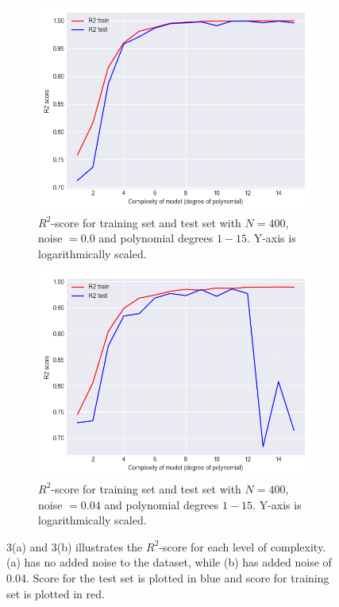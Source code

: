 \documentclass[a4paper,twocolumn]{article}
\begin{document}
\begin{figure}[ht]
    \centering
    \begin{subfigure}[b]{0.9\columnwidth}
        \includegraphics[width=\columnwidth]{r2_vs_complexity_N=400_Noise=0.0_Degree=1-15.png}
        \caption{$R^{2}$-score for training set and test set with $N = 400$, noise $= 0.0$ and polynomial degrees $1-15$. Y-axis is logarithmically scaled.}
    \end{subfigure}
    
    \begin{subfigure}[b]{0.9\columnwidth}
        \includegraphics[width=\columnwidth]{r2_vs_complexity_N=400_Noise=0.04_Degree=1-15.png}
        \caption{$R^{2}$-score for training set and test set with $N = 400$, noise $= 0.04$ and polynomial degrees $1-15$. Y-axis is logarithmically scaled.}
    \end{subfigure}
    \caption{3(a) and 3(b) illustrates the $R^{2}$-score for each level of complexity. (a) has no added noise to the dataset, while (b) has added noise of 0.04. Score for the test set is plotted in blue and score for training set is plotted in red.}
\end{figure}\\
\end{document}
